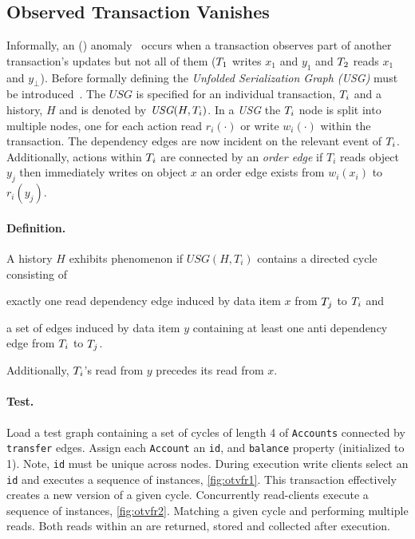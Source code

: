 \subsection{Observed Transaction Vanishes}
\label{sec:observ-trans-vanish}

Informally, an  ()
anomaly~\cite{DBLP:journals/pvldb/BailisDFGHS13} occurs when a transaction
observes part of another transaction's updates but not all of them
(\eg $T_1$ writes $x_1$ and $y_1$ and $T_2$ reads $x_1$ and $y_\bot$).
Before formally defining  the \emph{Unfolded Serialization Graph (USG)}
must be introduced~\cite{adya1999weak}. The $\textit{USG}$ is specified for an
individual transaction, $T_i$ and a history, $H$ and is denoted by
$\textit{USG}(H,T_i)$. In a \emph{USG} the $T_i$ node is split into
multiple nodes, one for each action read $r_i(\cdot)$ or  write $w_i(\cdot)$
within the transaction. The dependency edges are now incident on the relevant
event of $T_i$. Additionally, actions within $T_i$ are connected by
an \emph{order edge} \eg if $T_i$ reads object $y_j$ then immediately writes on
object $x$ an order edge exists from $w_i(x_i)$ to $r_i(y_j)$.

\paragraph{Definition.}
A history $H$ exhibits phenomenon  if $\textit{USG}(H,T_i)$
contains a directed cycle consisting of
\begin{enumerate*}[label={(\roman*)}]
  \item exactly one read dependency edge induced by data item $x$ from
  $T_j$ to $T_i$ and
  \item a set of edges induced by data item $y$ containing at least one anti
  dependency edge from $T_i$ to $T_j$.
\end{enumerate*}
Additionally, $T_i$'s read from $y$ precedes its read from $x$.

\paragraph{Test.}
Load a test graph containing a set of cycles of length 4 of \texttt{Accounts}
connected by \texttt{transfer} edges. Assign each \texttt{Account} an \texttt{id},
and \texttt{balance} property (initialized to 1). Note, \texttt{id} must be
unique across nodes. During execution write clients select an \texttt{id} and
executes a sequence of  instances, \autoref{fig:otvfr1}.
This transaction effectively creates a new version of a given cycle. Concurrently
read-clients execute a sequence of  instances, \autoref{fig:otvfr2}.
Matching a given cycle and performing multiple reads. Both reads within an
 are returned, stored and collected after execution.


